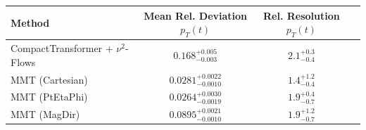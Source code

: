     \begin{tabular}{lccc}
        \toprule
        Method & Mean Rel. Deviation $p_{T}(t)$ & Rel. Resolution $p_{T}(t)$ \\
        \midrule
        CompactTransformer + $\nu^2$-Flows & $0.168^{+0.005}_{-0.003}$ & $2.1^{+0.3}_{-0.4}$ \\
        MMT (Cartesian) & $0.0281^{+0.0022}_{-0.0010}$ & $1.4^{+1.2}_{-0.4}$ \\
        MMT (PtEtaPhi) & $0.0264^{+0.0030}_{-0.0019}$ & $1.9^{+0.4}_{-0.7}$ \\
        MMT (MagDir) & $0.0895^{+0.0021}_{-0.0010}$ & $1.9^{+1.2}_{-0.7}$ \\
        \bottomrule
    \end{tabular}